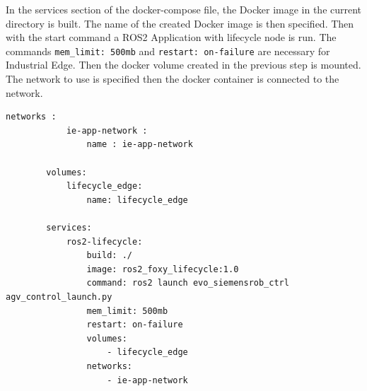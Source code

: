 In the services section of the docker-compose file, the Docker image in the current directory is built. The name of the created Docker image is then specified. Then with the start command a \gls{ROS2} Application with lifecycle node is run. The commands \lstinline{mem_limit: 500mb} and \lstinline{restart: on-failure} are necessary for Industrial Edge. Then the docker volume created in the previous step is mounted. The network to use is specified then the docker container is connected to the network.
\begin{lstlisting}[language=docker-compose,
		caption={docker-compose.yaml used by IE Publisher},
		label={Implementation:dockerCompose}]
		networks :
 			ie-app-network :
	 			name : ie-app-network

		volumes:
			lifecycle_edge:
				name: lifecycle_edge
		
		services:
			ros2-lifecycle:
				build: ./
				image: ros2_foxy_lifecycle:1.0
				command: ros2 launch evo_siemensrob_ctrl agv_control_launch.py 
				mem_limit: 500mb
				restart: on-failure
				volumes:
					- lifecycle_edge
				networks:
					- ie-app-network		
\end{lstlisting}
	

